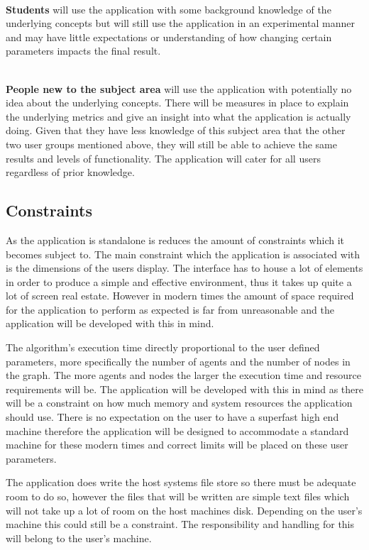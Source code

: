 \noindent \\
\textbf{Students} will use the application with some background knowledge of the underlying concepts but will still use the application in an experimental manner and may have little expectations or understanding of how changing certain parameters impacts the final result. 

\noindent \\
\textbf{People new to the subject area} will use the application with potentially no idea about the underlying concepts. There will be measures in place to explain the underlying metrics and give an insight into what the application is actually doing. Given that they have less knowledge of this subject area that the other two user groups mentioned above, they will still be able to achieve the same results and levels of functionality. The application will cater for all users regardless of prior knowledge.

\subsection{Constraints}

As the application is standalone is reduces the amount of constraints which it becomes subject to. The main constraint which the application is associated with is the dimensions of the users display. The interface has to house a lot of elements in order to produce a simple and effective environment, thus it takes up quite a lot of screen real estate. However in modern times the amount of space required for the application to perform as expected is far from unreasonable and the application will be developed with this in mind.

The algorithm’s execution time directly proportional to the user defined parameters, more specifically the number of agents and the number of nodes in the graph. The more agents and nodes the larger the execution time and resource requirements will be. The application will be developed with this in mind as there will be a constraint on how much memory and system resources the application should use. There is no expectation on the user to have a superfast high end machine therefore the application will be designed to accommodate a standard machine for these modern times and correct limits will be placed on these user parameters.

The application does write the host systems file store so there must be adequate room to do so, however the files that will be written are simple text files which will not take up a lot of room on the host machines disk. Depending on the user’s machine this could still be a constraint. The responsibility and handling for this will belong to the user’s machine.

